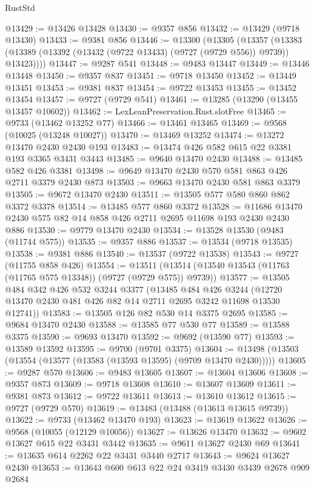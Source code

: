 \begin{lexlean}{RustStd}
\begin{coremodule}
{\begin{coremodule}
{{{{{{{{{{{{{{{{{{{{{{{{{{{{{{{{{{{{{{{{{{{{{{{{{{{{{{{@13429 := @13426 @13428
@13430 := @9357 @856
@13432 := @13429 (@9718 @13430)
@13433 := @9381 @856
@13446 := @13300
    (@13305
      (@13357 (@13383 (@13389 (@13392 (@13432 (@9722 @13433) (@9727 (@9729 @556)) @9739)) @13423))))
@13447 := @9287 @541
@13448 := @9483 @13447
@13449 := @13446 @13448
@13450 := @9357 @837
@13451 := @9718 @13450
@13452 := @13449 @13451
@13453 := @9381 @837
@13454 := @9722 @13453
@13455 := @13452 @13454
@13457 := @9727 (@9729 @541)
@13461 := @13285 (@13290 (@13455 @13457 @10602))
@13462 := LexLeanPreservation.Rust.slotFree
@13465 := @9733 (@13462 @13252 @77)
@13466 := @13461 @13465
@13469 := @9568 (@10025 (@13248 @10027))
@13470 := @13469 @13252
@13474 := @13272 @13470 @2430 @2430 @193
@13483 := @13474 @426 @582 @615 @22 @3381 @193 @3365 @3431 @3443
@13485 := @9640 @13470 @2430
@13488 := @13485 @582 @426 @3381
@13498 := @9649 @13470 @2430 @570 @581 @863 @426 @2711 @3379 @2430 @873
@13503 := @9663 @13470 @2430 @581 @863 @3379
@13505 := @9672 @13470 @2430
@13511 := @13505 @577 @580 @860 @862 @3372 @3378
@13514 := @13485 @577 @860 @3372
@13528 := @11686 @13470 @2430 @575 @82 @14 @858 @426 @2711 @2695 @11698 @193 @2430 @2430 @886
@13530 := @9779 @13470 @2430
@13534 := @13528 @13530 (@9483 (@11744 @575))
@13535 := @9357 @886
@13537 := @13534 (@9718 @13535)
@13538 := @9381 @886
@13540 := @13537 (@9722 @13538)
@13543 := @9727 (@11755 @858 @426)
@13554 := @13511 (@13514 (@13540 @13543 (@11763 (@11765 @575 @13348)) (@9727 (@9729 @575)) @9739))
@13577 := @13505
    @484
    @342
    @426
    @532
    @3244
    @3377
    (@13485
      @484
      @426
      @3244
      (@12720 @13470 @2430 @481 @426 @82 @14 @2711 @2695 @3242 @11698 @13530 @12741))
@13583 := @13505 @126 @82 @530 @14 @3375 @2695
@13585 := @9684 @13470 @2430
@13588 := @13585 @77 @530 @77
@13589 := @13588 @3375
@13590 := @9693 @13470
@13592 := @9692 (@13590 @77)
@13593 := @13589 @13592
@13595 := @9700 (@9701 @3375)
@13604 := @13498 (@13503 (@13554 (@13577 (@13583 (@13593 @13595) (@9709 @13470 @2430)))))
@13605 := @9287 @570
@13606 := @9483 @13605
@13607 := @13604 @13606
@13608 := @9357 @873
@13609 := @9718 @13608
@13610 := @13607 @13609
@13611 := @9381 @873
@13612 := @9722 @13611
@13613 := @13610 @13612
@13615 := @9727 (@9729 @570)
@13619 := @13483 (@13488 (@13613 @13615 @9739))
@13622 := @9733 (@13462 @13470 @193)
@13623 := @13619 @13622
@13626 := @9568 (@10055 (@12129 @10056))
@13627 := @13626 @13470
@13632 := @9602 @13627 @615 @22 @3431 @3442
@13635 := @9611 @13627 @2430 @69
@13641 := @13635 @614 @2262 @22 @3431 @3440 @2717
@13643 := @9624 @13627 @2430
@13653 := @13643 @600 @613 @22 @24 @3419 @3430 @3439 @2678 @909 @2684
}}}}}}}}}}}}}}}}}}}}}}}}}}}}}}}}}}}}}}}}}}}}}}}}}}}}}}}
\end{coremodule}}
\end{coremodule}
\end{lexlean}
